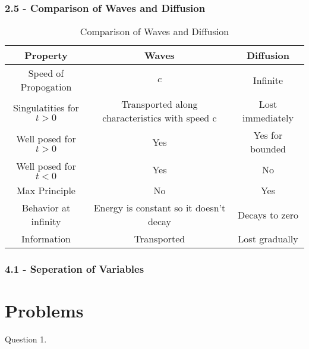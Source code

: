 \documentclass[answers,12pt,addpoints]{exam}
\begin{document}
\subsubsection{2.5 - Comparison of Waves and Diffusion}
\begin{table}[h!]
\centering
\begin{tabular}{|c|c|c|}
\hline
\textbf{Property} & \textbf{Waves} & \textbf{Diffusion} \\ \hline
Speed of Propogation & $c$ & Infinite \\ \hline
Singulatities for $t > 0$ & Transported along characteristics with speed c & Lost immediately \\ \hline
Well posed for $t > 0$ & Yes & Yes for bounded \\ \hline
Well posed for $t < 0$ & Yes & No \\ \hline
Max Principle & No & Yes \\ \hline
Behavior at infinity & Energy is constant so it doesn't decay & Decays to zero \\ \hline
Information & Transported & Lost gradually \\ \hline
\end{tabular}
\caption{Comparison of Waves and Diffusion}
\label{tab:comparison}
\end{table}
\subsubsection{4.1 - Seperation of Variables}



\newpage

\section{Problems}
\begin{questions}
    \question Question 1.
\end{questions}
\end{document}
